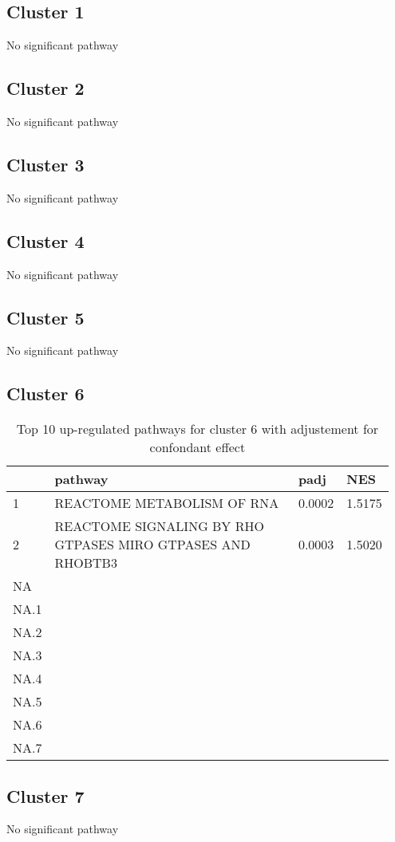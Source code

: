 \documentclass{article}
\begin{document}
\subsection{Cluster 1 }
No significant pathway
\subsection{Cluster 2 }
No significant pathway
\subsection{Cluster 3 }
No significant pathway
\subsection{Cluster 4 }
No significant pathway
\subsection{Cluster 5 }
No significant pathway
\subsection{Cluster 6 }
\begin{table}[H]
\centering
\begin{tabular}{p{0.05\linewidth}p{0.7\linewidth}p{0.1\linewidth}p{0.1\linewidth}}
  \hline
 & pathway & padj & NES \\ 
  \hline
1 & REACTOME METABOLISM OF RNA & 0.0002 & 1.5175 \\ 
  2 & REACTOME SIGNALING BY RHO GTPASES MIRO GTPASES AND RHOBTB3 & 0.0003 & 1.5020 \\ 
  NA &  &  &  \\ 
  NA.1 &  &  &  \\ 
  NA.2 &  &  &  \\ 
  NA.3 &  &  &  \\ 
  NA.4 &  &  &  \\ 
  NA.5 &  &  &  \\ 
  NA.6 &  &  &  \\ 
  NA.7 &  &  &  \\ 
   \hline
\end{tabular}
\caption{Top 10 up-regulated pathways for cluster 6 with adjustement for confondant effect} 
\label{tab:q3_2_conf_6}
\end{table}
\subsection{Cluster 7 }
No significant pathway
\end{document}
